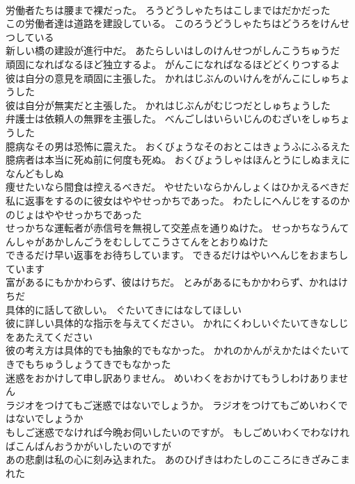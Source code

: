 \documentclass[8pt]{extreport}
\begin{document}
\begin{CJK}{UTF8}{min}
\\	労働者たちは腰まで裸だった。	ろうどうしゃたちはこしまではだかだった 
\\	この労働者達は道路を建設している。	このろうどうしゃたちはどうろをけんせつしている 
\\	新しい橋の建設が進行中だ。	あたらしいはしのけんせつがしんこうちゅうだ 
\\	頑固になればなるほど独立するよ。	がんこになればなるほどどくりつするよ 
\\	彼は自分の意見を頑固に主張した。	かれはじぶんのいけんをがんこにしゅちょうした 
\\	彼は自分が無実だと主張した。	かれはじぶんがむじつだとしゅちょうした 
\\	弁護士は依頼人の無罪を主張した。	べんごしはいらいじんのむざいをしゅちょうした 
\\	臆病なその男は恐怖に震えた。	おくびょうなそのおとこはきょうふにふるえた 
\\	臆病者は本当に死ぬ前に何度も死ぬ。	おくびょうしゃはほんとうにしぬまえになんどもしぬ 
\\	痩せたいなら間食は控えるべきだ。	やせたいならかんしょくはひかえるべきだ 
\\	私に返事をするのに彼女はややせっかちであった。	わたしにへんじをするのかのじょはややせっかちであった 
\\	せっかちな運転者が赤信号を無視して交差点を通りぬけた。	せっかちなうんてんしゃがあかしんごうをむししてこうさてんをとおりぬけた 
\\	できるだけ早い返事をお待ちしています。	できるだけはやいへんじをおまちしています 
\\	富があるにもかかわらず、彼はけちだ。	とみがあるにもかかわらず、かれはけちだ 
\\	具体的に話して欲しい。	ぐたいてきにはなしてほしい 
\\	彼に詳しい具体的な指示を与えてください。	かれにくわしいぐたいてきなしじをあたえてください 
\\	彼の考え方は具体的でも抽象的でもなかった。	かれのかんがえかたはぐたいてきでもちゅうしょうてきでもなかった 
\\	迷惑をおかけして申し訳ありません。	めいわくをおかけてもうしわけありません 
\\	ラジオをつけてもご迷惑ではないでしょうか。	ラジオをつけてもごめいわくではないでしょうか 
\\	もしご迷惑でなければ今晩お伺いしたいのですが。	もしごめいわくでわなければこんばんおうかがいしたいのですが 
\\	あの悲劇は私の心に刻み込まれた。	あのひげきはわたしのこころにきざみこまれた 

\end{CJK}
\end{document}

